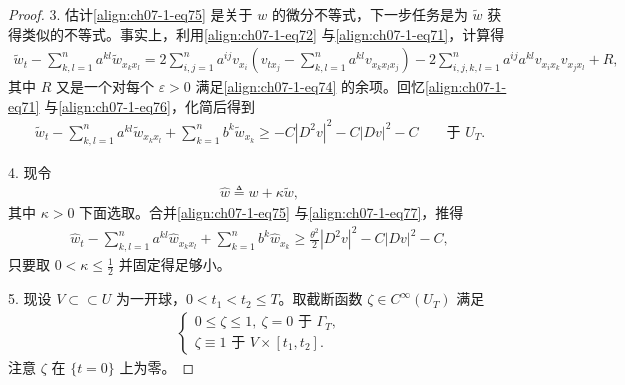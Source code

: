 \documentclass[../../main.tex]{subfiles}
\begin{document}
\begin{proof}
3. 估计\eqref{align:ch07-1-eq75} 是关于 $w$ 的微分不等式，下一步任务是为 $\widetilde{w}$ 获得类似的不等式。事实上，利用\eqref{align:ch07-1-eq72} 与\eqref{align:ch07-1-eq71}，计算得
\begin{align*}
\widetilde{w}_t - \sum_{k,l=1}^n a^{kl}\widetilde{w}_{x_kx_l}
= 2\sum_{i,j=1}^n a^{ij}v_{x_i}\left(v_{tx_j}-\sum_{k,l=1}^n a^{kl}v_{x_kx_lx_j}\right) - 2\sum_{i,j,k,l=1}^n a^{ij}a^{kl}v_{x_ix_k}v_{x_jx_l} + R,
\end{align*}
其中 $R$ 又是一个对每个 $\varepsilon>0$ 满足\eqref{align:ch07-1-eq74} 的余项。回忆\eqref{align:ch07-1-eq71} 与\eqref{align:ch07-1-eq76}，化简后得到
\begin{align}
\widetilde{w}_t - \sum_{k,l=1}^n a^{kl}\widetilde{w}_{x_kx_l} + \sum_{k=1}^n b^k\widetilde{w}_{x_k} \geqslant -C|D^2v|^2 - C|Dv|^2 - C\qquad \text{于 } U_T.\label{align:ch07-1-eq77}
\end{align}

4. 现令
\begin{align}
\widehat{w}\triangleq w+\kappa\widetilde{w},\label{align:ch07-1-eq78}
\end{align}
其中 $\kappa>0$ 下面选取。合并\eqref{align:ch07-1-eq75} 与\eqref{align:ch07-1-eq77}，推得
\begin{align}
\widehat{w}_t - \sum_{k,l=1}^n a^{kl}\widehat{w}_{x_kx_l} + \sum_{k=1}^n b^k\widehat{w}_{x_k} \geqslant \frac{\theta^2}{2}|D^2v|^2 - C|Dv|^2 - C,\label{align:ch07-1-eq79}
\end{align}
只要取 $0<\kappa\leqslant\frac12$ 并固定得足够小。

5. 现设 $V\subset\subset U$ 为一开球，$0<t_1<t_2\leqslant T$。取截断函数 $\zeta\in C^\infty(U_T)$ 满足
\begin{align}
\begin{cases}
0\leqslant\zeta\leqslant 1,\ \zeta=0 \text{ 于 } \Gamma_T,\\
\zeta\equiv 1 \text{ 于 } V\times[t_1,t_2].
\end{cases}\label{align:ch07-1-eq80}
\end{align}
注意 $\zeta$ 在 $\{t=0\}$ 上为零。


\end{proof}
\end{document}

